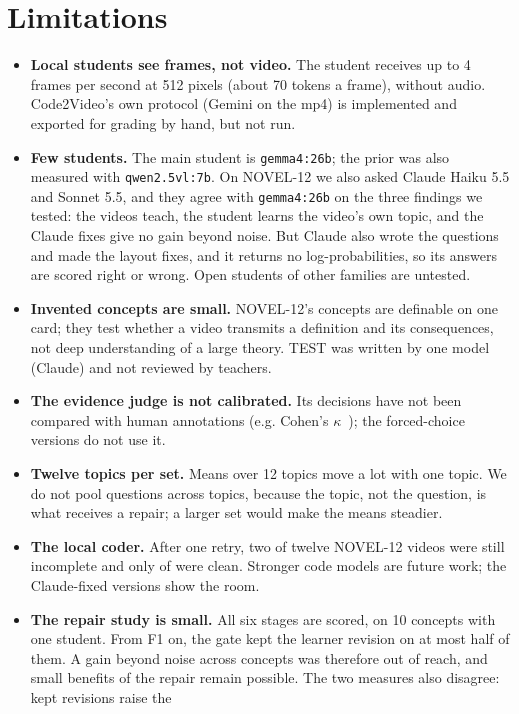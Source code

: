 \section{Limitations}

\begin{itemize}
  \item \textbf{Local students see frames, not video.} The student receives up to 4 frames per second at 512 pixels
  (about 70 tokens a frame), without audio. Code2Video's own protocol (Gemini on the mp4) is implemented and exported
  for grading by hand, but not run.
  \item \textbf{Few students.} The main student is \texttt{gemma4:26b}; the prior was also measured with
  \texttt{qwen2.5vl:7b}. On NOVEL-12 we also asked Claude Haiku 5.5 and Sonnet 5.5, and they agree with
  \texttt{gemma4:26b} on the three findings we tested: the videos teach, the student learns the video's own topic,
  and the Claude fixes give no gain beyond noise. But Claude also wrote the questions and made the layout fixes, and it returns
  no log-probabilities, so its answers are scored right or wrong. Open students of other families are untested.
  \item \textbf{Invented concepts are small.} NOVEL-12's concepts are definable on one card; they test whether a video
  transmits a definition and its consequences, not deep understanding of a large theory. TEST was written by one model
  (Claude) and not reviewed by teachers.
  \item \textbf{The evidence judge is not calibrated.} Its decisions have not been compared with human annotations
  (e.g. Cohen's $\kappa$~\cite{cohen1960}); the forced-choice versions do not use it.
  \item \textbf{Twelve topics per set.} Means over 12 topics move a lot with one topic. We do not pool questions
  across topics, because the topic, not the question, is what receives a repair; a larger set would make the means
  steadier.
  \item \textbf{The local coder.} After one retry, two of twelve NOVEL-12 videos were still incomplete and only
  \AdmClean{} of \AdmTotal{} were clean. Stronger code models are future work; the Claude-fixed versions show the
  room.
  \item \textbf{The repair study is small.} All six stages are scored, on 10 concepts with one student. From F1 on,
  the gate kept the learner revision on at most half of them. A gain beyond noise across concepts was therefore out of
  reach, and small benefits of the repair remain possible. The two measures also disagree: kept revisions raise the

\end{itemize}
